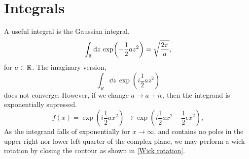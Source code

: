 \section{Integrals}
\label{section:gaussian integrals}
A useful integral is the Gaussian integral,
\begin{equation}
    \int_{\mathbb{R}} \dd z \, \exp(- \frac{1}{2} a z^2) = \sqrt{\frac{2 \pi}{a}},
\end{equation}
for $a \in \mathbb{R}$. The imaginary version,
\begin{equation}
    \int_R \dd z \, \exp(i \frac{1}{2} a z^2 )
\end{equation}
does not converge. However, if we change $a \rightarrow a + i\epsilon$, 
then the integrand is exponentially supressed.
\begin{equation}
    f(x) = \exp(i \frac{1}{2}a x^2) \rightarrow
    \exp(i\frac{1}{2}a x^2 - \frac{1}{2} \epsilon  x^2),
\end{equation}
As the integrand falls of exponentially for $x\rightarrow \infty$, and contains no poles in the upper right nor lower left quarter of the complex plane, we may perform a wick rotation by closing the contour as shown in \autoref{Wick rotation}.
